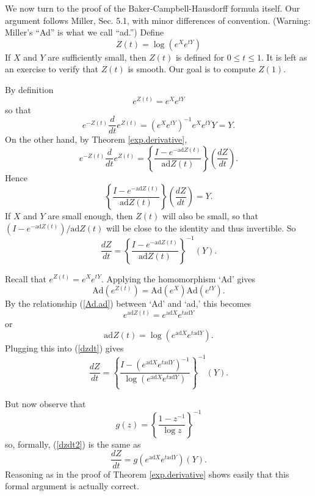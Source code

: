 \documentclass[12pt]{amsbook}
\theoremstyle{plain}
\numberwithin{equation}{chapter}
\numberwithin{theorem}{chapter}
\begin{document}
We now turn to the proof of the Baker-Campbell-Hausdorff formula itself. Our
argument follows Miller, Sec. 5.1, with minor differences of convention.
(Warning: Miller's ``Ad'' is what we call ``ad.'') Define
\[
Z(t)=\log\left(  e^{X}e^{tY}\right)
\]
If $X$ and $Y$ are sufficiently small, then $Z\left(  t\right)  $ is defined
for $0\leq t\leq1$. It is left as an exercise to verify that $Z(t)$ is smooth.
Our goal is to compute $Z(1).$

By definition
\[
e^{Z(t)}=e^{X}e^{tY}%
\]
so that
\[
e^{-Z(t)}\frac d{dt}e^{Z(t)}=\left(  e^{X}e^{tY}\right)  ^{-1}e^{X}%
e^{tY}Y=Y\text{.}%
\]
On the other hand, by Theorem \ref{exp.derivative},
\[
e^{-Z(t)}\frac d{dt}e^{Z(t)}=\left\{  \frac{I-e^{-\mathrm{ad}Z(t)}%
}{\mathrm{ad}Z(t)}\right\}  \left(  \frac{dZ}{dt}\right)  \text{.}%
\]
Hence
\[
\left\{  \frac{I-e^{-\mathrm{ad}Z(t)}}{\mathrm{ad}Z(t)}\right\}  \left(
\frac{dZ}{dt}\right)  =Y\text{.}%
\]
If $X$ and $Y$ are small enough, then $Z(t)$ will also be small, so that
$\left(  I-e^{-\mathrm{ad}Z(t)}\right)  /\mathrm{ad}Z(t)$ will be close to the
identity and thus invertible. So
\begin{equation}
\frac{dZ}{dt}=\left\{  \frac{I-e^{-\mathrm{ad}Z(t)}}{\mathrm{ad}Z(t)}\right\}
^{-1}(Y)\text{.}\label{dzdt}%
\end{equation}

Recall that $e^{Z(t)}=e^{X}e^{tY}$. Applying the homomorphism `Ad' gives
\[
\mathrm{Ad}\left(  e^{Z(t)}\right)  =\mathrm{Ad}\left(  e^{X}\right)
\mathrm{Ad}\left(  e^{tY}\right)  \text{.}%
\]
By the relationship (\ref{Ad.ad}) between `Ad' and `ad,' this becomes
\[
e^{\mathrm{ad}Z(t)}=e^{\mathrm{ad}X}e^{t\mathrm{ad}Y}%
\]
or
\[
\mathrm{ad}Z(t)=\log\left(  e^{\mathrm{ad}X}e^{t\mathrm{ad}Y}\right)  \text{.}%
\]
Plugging this into (\ref{dzdt}) gives
\begin{equation}
\frac{dZ}{dt}=\left\{  \frac{I-\left(  e^{\mathrm{ad}X}e^{t\mathrm{ad}%
Y}\right)  ^{-1}}{\log\left(  e^{\mathrm{ad}X}e^{t\mathrm{ad}Y}\right)
}\right\}  ^{-1}(Y)\text{.}\label{dzdt2}%
\end{equation}

But now observe that
\[
g(z)=\left\{  \frac{1-z^{-1}}{\log z}\right\}  ^{-1}%
\]
so, formally, (\ref{dzdt2}) is the same as
\begin{equation}
\frac{dZ}{dt}=g\left(  e^{\mathrm{ad}X}e^{t\mathrm{ad}Y}\right)
(Y)\text{.}\label{dzdt3}%
\end{equation}
Reasoning as in the proof of Theorem \ref{exp.derivative} shows easily that
this formal argument is actually correct.
\end{document}
